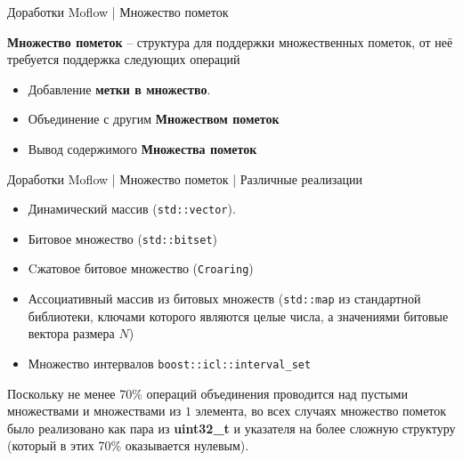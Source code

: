 \documentclass[10pt]{beamer}
\begin{document}
\begin{frame}{Доработки Moflow | Множество пометок}
    
    \textbf{Множество пометок} -- структура для поддержки множественных пометок, от неё требуется поддержка следующих операций
    \begin{itemize}
        \item Добавление \textbf{метки в множество}.
        \item Объединение с другим \textbf{Множеством пометок}
        \item Вывод содержимого \textbf{Множества пометок}
     \end{itemize}

\end{frame}

\begin{frame}{Доработки Moflow | Множество пометок | Различные реализации }
    \begin{itemize}

        \item Динамический массив (\texttt{std::vector}).
        \item Битовое множество (\texttt{std::bitset})
        \item Cжатовое битовое множество (\texttt{Croaring})
        \item Ассоциативный массив из битовых множеств (\texttt{std::map} из стандартной библиотеки, ключами которого являются целые числа, а значениями битовые вектора размера $N$)
        \item Множество интервалов \texttt{boost::icl::interval\_set}
     \end{itemize}
     \pause
       Поскольку не менее 70\% операций объединения проводится над пустыми множествами и множествами из $1$ элемента, во всех случаях множество пометок было реализовано как пара из \textbf{uint32\_t} и указателя на более сложную структуру (который в этих 70\% оказывается нулевым).

\end{frame}
\end{document}
